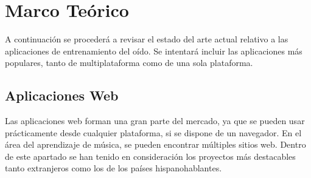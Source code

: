 \chapter{Marco Teórico}
\label{marcoteorico}
A continuación se procederá a revisar el estado del arte actual relativo a las aplicaciones de entrenamiento del oído. Se intentará incluir las aplicaciones más populares, tanto de multiplataforma como de una sola plataforma.
\section{Aplicaciones Web}
Las aplicaciones web forman una gran parte del mercado, ya que se pueden usar prácticamente desde cualquier plataforma, si se dispone de un navegador. En el área del aprendizaje de música, se pueden encontrar múltiples sitios web. Dentro de este apartado se han tenido en consideración los proyectos más destacables tanto extranjeros como los de los países hispanohablantes.
